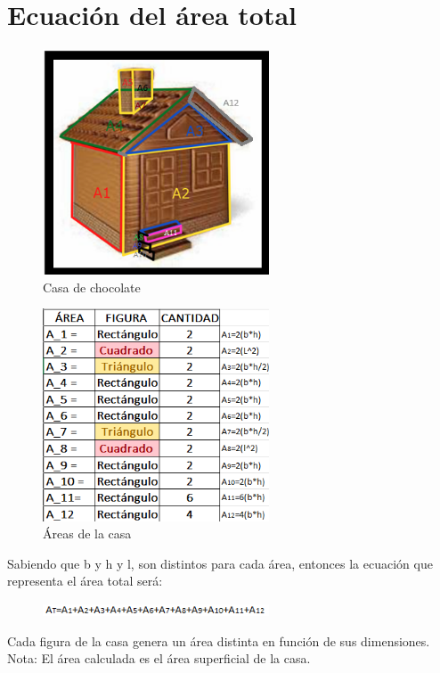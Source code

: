 \documentclass{article}
\theoremstyle{mytheoremstyle}
\theoremstyle{mytheoremstyle}
\theoremstyle{myproblemstyle}
\begin{document}
\section{Ecuación del área total}
\begin{figure}[H]
    \centering
    \includegraphics[width=0.6\textwidth]{CASA3.png}
    \caption{Casa de chocolate}
    \label{fig:imagen1}
    \end{figure}

\begin{figure}[H]
    \centering
    \includegraphics[width=0.6\textwidth]{2.png}
    \caption{Áreas de la casa}
    \label{fig:imagen1}
    \end{figure}
Sabiendo que b y h y l, son distintos para cada área, entonces la ecuación que representa el área total será:
\begin{figure}[H]
    \centering
    \includegraphics[width=0.6\textwidth]{1.png}
    
    \label{fig:imagen1}
    \end{figure}
    Cada figura de la casa genera un área distinta en función de sus dimensiones.\newline
Nota: El área calculada es el área superficial de la casa.
\end{document}
